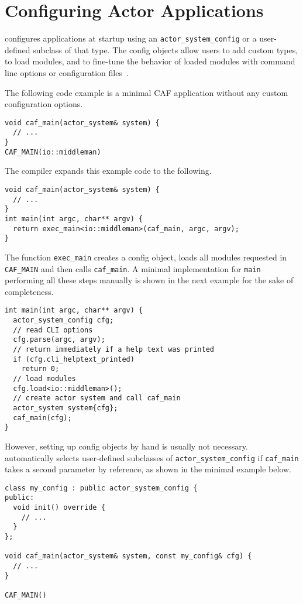 \section{Configuring Actor Applications}
\label{system-config}

\lib configures applications at startup using an \lstinline^actor_system_config^ or a user-defined subclass of that type. The config objects allow users to add custom types, to load modules, and to fine-tune the behavior of loaded modules with command line options or configuration files~.

The following code example is a minimal CAF application without any custom configuration options.

\begin{lstlisting}
void caf_main(actor_system& system) {
  // ...
}
CAF_MAIN(io::middleman)
\end{lstlisting}

The compiler expands this example code to the following.

\begin{lstlisting}
void caf_main(actor_system& system) {
  // ...
}
int main(int argc, char** argv) {
  return exec_main<io::middleman>(caf_main, argc, argv);
}
\end{lstlisting}

The function \lstinline^exec_main^ creates a config object, loads all modules requested in \lstinline^CAF_MAIN^ and then calls \lstinline^caf_main^. A minimal implementation for \lstinline^main^ performing all these steps manually is shown in the next example for the sake of completeness.

\begin{lstlisting}
int main(int argc, char** argv) {
  actor_system_config cfg;
  // read CLI options
  cfg.parse(argc, argv);
  // return immediately if a help text was printed
  if (cfg.cli_helptext_printed)
    return 0;
  // load modules
  cfg.load<io::middleman>();
  // create actor system and call caf_main
  actor_system system{cfg};
  caf_main(cfg);
}
\end{lstlisting}

However, setting up config objects by hand is usually not necessary. \lib automatically selects user-defined subclasses of \lstinline^actor_system_config^ if \lstinline^caf_main^ takes a second parameter by reference, as shown in the minimal example below.

\begin{lstlisting}
class my_config : public actor_system_config {
public:
  void init() override {
    // ...
  }
};

void caf_main(actor_system& system, const my_config& cfg) {
  // ...
}

CAF_MAIN()
\end{lstlisting}

